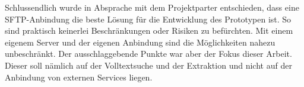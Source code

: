 Schlussendlich wurde in Absprache mit dem Projektparter entschieden, dass eine SFTP-Anbindung die beste Lösung für die Entwicklung des Prototypen ist. So sind praktisch keinerlei Beschränkungen oder Risiken zu befürchten. Mit einem eigenem Server und der eigenen Anbindung sind die Möglichkeiten nahezu unbeschränkt. Der ausschlaggebende Punkte war aber der Fokus dieser Arbeit. Dieser soll nämlich auf der Volltextsuche und der Extraktion und nicht auf der Anbindung von externen Services liegen.



